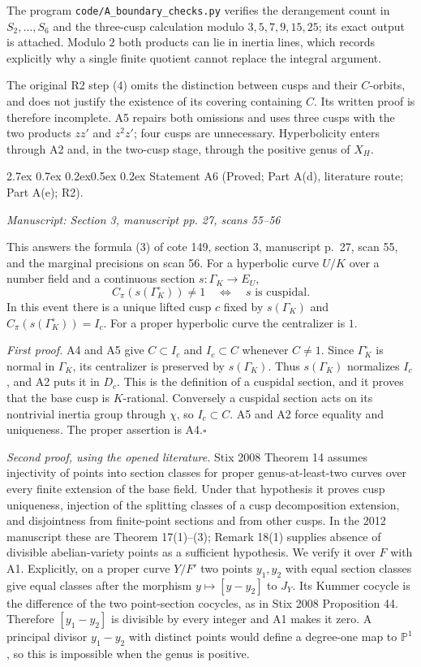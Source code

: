 \documentclass[11pt,a4paper]{article}
\makeatletter
\newcommand{\passage}[1]{\par\smallskip\noindent\textit{Manuscript: #1}\par\smallskip}
\renewcommand\paragraph{\@startsection{paragraph}{4}{\z@}%
  {2.7ex \@plus 0.7ex \@minus 0.2ex}{0.5ex \@plus 0.2ex}%
  {\normalfont\normalsize\bfseries}}
\makeatother
\begin{document}
The program \texttt{code/A\_boundary\_checks.py} verifies the derangement count in $S_2,\ldots,S_6$ and the three-cusp calculation modulo $3,5,7,9,15,25$; its exact output is attached. Modulo $2$ both products can lie in inertia lines, which records explicitly why a single finite quotient cannot replace the integral argument.

The original R2 step (4) omits the distinction between cusps and their $C$-orbits, and does not justify the existence of its covering containing $C$. Its written proof is therefore incomplete. A5 repairs both omissions and uses three cusps with the two products $zz'$ and $z^2z'$; four cusps are unnecessary. Hyperbolicity enters through A2 and, in the two-cusp stage, through the positive genus of $X_H$.

\paragraph{Statement A6 (Proved; Part A(d), literature route; Part A(e); R2).}\label{res:A6}
\passage{Section 3, manuscript pp. 27, scans 55–56}

This answers the formula (3) of cote 149, section 3, manuscript p.~27, scan 55, and the marginal precisions on scan 56.
For a hyperbolic curve $U/K$ over a number field and a continuous section $s:\Gamma_K\to E_U$,
\[
 C_\pi(s(\Gamma_K^\circ))\ne1
 \quad\Longleftrightarrow\quad s\text{ is cuspidal}.
\]
In this event there is a unique lifted cusp $c$ fixed by $s(\Gamma_K)$ and
$C_\pi(s(\Gamma_K^\circ))=I_c$. For a proper hyperbolic curve the centralizer is $1$.

\emph{First proof.} A4 and A5 give $C\subset I_c$ and $I_c\subset C$ whenever $C\ne1$. Since $\Gamma_K^\circ$ is normal in $\Gamma_K$, its centralizer is preserved by $s(\Gamma_K)$. Thus $s(\Gamma_K)$ normalizes $I_c$, and A2 puts it in $D_c$. This is the definition of a cuspidal section, and it proves that the base cusp is $K$-rational. Conversely a cuspidal section acts on its nontrivial inertia group through $\chi$, so $I_c\subset C$. A5 and A2 force equality and uniqueness. The proper assertion is A4.\hfill$\square$

\emph{Second proof, using the opened literature.} Stix 2008 Theorem 14 assumes injectivity of points into section classes for proper genus-at-least-two curves over every finite extension of the base field. Under that hypothesis it proves cusp uniqueness, injection of the splitting classes of a cusp decomposition extension, and disjointness from finite-point sections and from other cusps. In the 2012 manuscript these are Theorem 17(1)--(3); Remark 18(1) supplies absence of divisible abelian-variety points as a sufficient hypothesis. We verify it over $F$ with A1. Explicitly, on a proper curve $Y/F'$ two points $y_1,y_2$ with equal section classes give equal classes after the morphism $y\mapsto[y-y_2]$ to $J_Y$. Its Kummer cocycle is the difference of the two point-section cocycles, as in Stix 2008 Proposition 44. Therefore $[y_1-y_2]$ is divisible by every integer and A1 makes it zero. A principal divisor $y_1-y_2$ with distinct points would define a degree-one map to $\mathbb P^1$, so this is impossible when the genus is positive.
\end{document}
